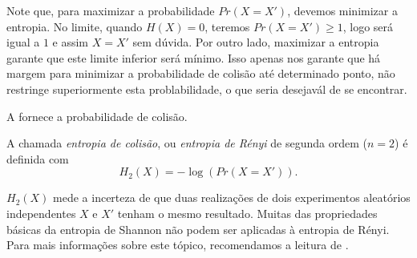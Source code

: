 Note que, para maximizar a probabilidade $Pr(X = X')$, devemos minimizar a entropia.
No limite, quando $H(X)=0$, teremos $Pr(X = X') \geq 1$, logo será igual a $1$ e assim $X = X'$ sem dúvida.
Por outro lado, maximizar a entropia garante que este limite inferior será mínimo.
Isso apenas nos garante que há margem para minimizar a probabilidade de colisão até determinado ponto,
não restringe superiormente esta problabilidade, o que seria desejavál de se encontrar.


A  fornece a probabilidade de colisão. 
\begin{definition}
  A chamada \emph{entropia de colisão}, ou \emph{entropia
  de Rényi} de segunda ordem ($n=2$) é definida com
\begin{equation}
  H_2(X) = -\log (Pr(X = X')) .
\end{equation}
\end{definition}
$H_2(X)$ mede a incerteza de que duas realizações de dois experimentos aleatórios independentes $X$ e $X'$
tenham o mesmo resultado. Muitas das propriedades básicas da entropia de Shannon não podem
ser aplicadas à entropia de Rényi. Para mais informações sobre este tópico,
recomendamos a leitura de \textcite{delfs2015}.


